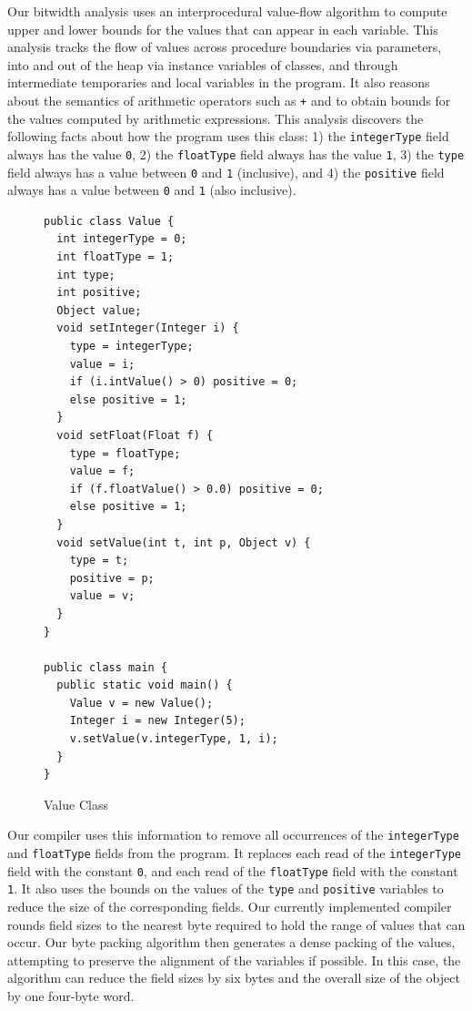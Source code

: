 \documentclass[preprint]{acmconf}
\begin{document}
Our bitwidth analysis uses an interprocedural
value-flow algorithm to compute upper and lower bounds for the
values that can appear in each variable. This analysis tracks
the flow of values across procedure boundaries via parameters,
into and out of the heap via instance variables of classes, and through
intermediate temporaries and local variables in the program.
It also reasons about the semantics of arithmetic operators such
as {\tt +} and {\tt *} to obtain bounds for the values computed
by arithmetic expressions. 
This analysis discovers the following facts about 
how the program uses this class: 1) the {\tt integerType} 
field always has the value {\tt 0}, 2) the {\tt floatType} 
field always has the value {\tt 1}, 3) the {\tt type} 
field always has a value between {\tt 0} and {\tt 1} (inclusive),
and 4) the {\tt positive} field always has a value between 
{\tt 0} and {\tt 1} (also inclusive).

\begin{figure}
\begin{verbatim}
public class Value { 
  int integerType = 0;
  int floatType = 1;
  int type;
  int positive;
  Object value;
  void setInteger(Integer i) { 
    type = integerType;
    value = i;
    if (i.intValue() > 0) positive = 0;
    else positive = 1;
  }
  void setFloat(Float f) { 
    type = floatType;
    value = f;
    if (f.floatValue() > 0.0) positive = 0;
    else positive = 1;
  }
  void setValue(int t, int p, Object v) { 
    type = t;
    positive = p;
    value = v;
  }
}

public class main { 
  public static void main() { 
    Value v = new Value();
    Integer i = new Integer(5);
    v.setValue(v.integerType, 1, i);
  }
}
\end{verbatim}
\caption{\label{fig:value} Value Class}
\end{figure}

Our compiler uses this information to remove all occurrences
of the {\tt integerType} and {\tt floatType} fields from the
program. It replaces each read of the {\tt integerType} field
with the constant {\tt 0}, and each read of the {\tt floatType}
field with the constant {\tt 1}. It also uses the bounds on the 
values of the {\tt type} and {\tt positive} variables to reduce the size of the 
corresponding fields. Our currently implemented compiler rounds
field sizes to the nearest byte required to hold the range
of values that can occur. Our byte packing algorithm then 
generates a dense packing of the values, attempting to preserve
the alignment of the variables if possible. In this case, the
algorithm can reduce the field sizes by six bytes and the overall
size of the object by one four-byte word. 
\end{document}

